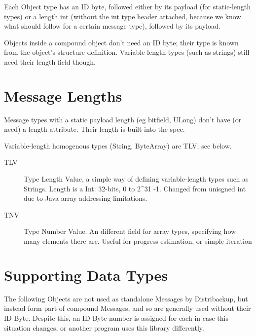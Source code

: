 \documentclass[12pt,a4paper,]{adreport}
\begin{document}
Each Object type has an ID byte, followed either by its payload (for
static-length types) or a length int (without the int type header
attached, because we know what should follow for a certain message
type), followed by its payload.

Objects inside a compound object don't need an ID byte; their type is
known from the object's structure definition. Variable-length types
(such as strings) still need their length field though.

\section{Message Lengths}\label{message-lengths}

Message types with a static payload length (eg bitfield, ULong) don't
have (or need) a length attribute. Their length is built into the spec.

Variable-length homogenous types (String, ByteArray) are TLV; see below.

\begin{description}
\item[TLV]
Type Length Value, a simple way of defining variable-length types such
as Strings. Length is a Int: 32-bits, 0 to 2\^{}31 -1. Changed from
unisgned int due to Java array addressing limitations.
\item[TNV]
Type Number Value. An different field for array types, specifying how
many elements there are. Useful for progress estimation, or simple
iteration
\end{description}

\section{Supporting Data Types}\label{supporting-data-types}

The following Objects are not used as standalone Messages by
Distribackup, but instead form part of compound Messages, and so are
generally used without their ID Byte. Despite this, an ID Byte number is
assigned for each in case this situation changes, or another program
uses this library differently.
\end{document}
